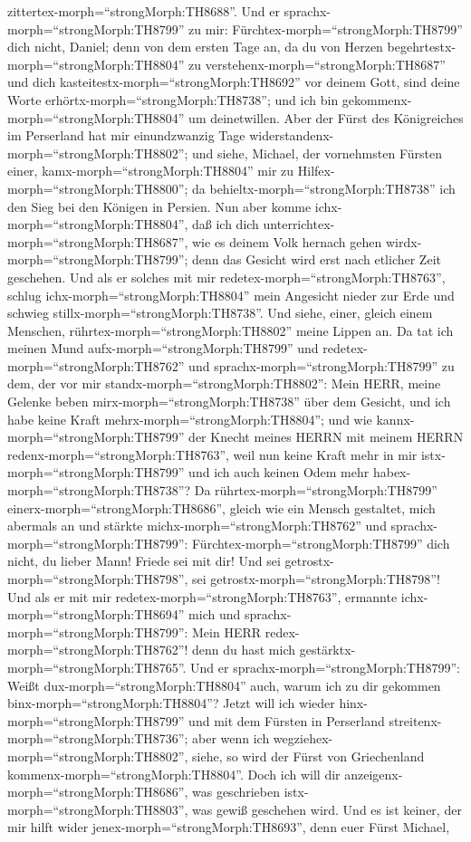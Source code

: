 zittertex-morph=``strongMorph:TH8688''.  Und er
sprachx-morph=``strongMorph:TH8799'' zu mir:
Fürchtex-morph=``strongMorph:TH8799'' dich nicht, Daniel; denn von dem
ersten Tage an, da du von Herzen
begehrtestx-morph=``strongMorph:TH8804'' zu
verstehenx-morph=``strongMorph:TH8687'' und dich
kasteitestx-morph=``strongMorph:TH8692'' vor deinem Gott, sind deine
Worte erhörtx-morph=``strongMorph:TH8738''; und ich bin
gekommenx-morph=``strongMorph:TH8804'' um deinetwillen. 
Aber der Fürst des Königreiches im Perserland hat mir einundzwanzig Tage
widerstandenx-morph=``strongMorph:TH8802''; und siehe, Michael, der
vornehmsten Fürsten einer, kamx-morph=``strongMorph:TH8804'' mir zu
Hilfex-morph=``strongMorph:TH8800''; da
behieltx-morph=``strongMorph:TH8738'' ich den Sieg bei den Königen in
Persien.  Nun aber komme ichx-morph=``strongMorph:TH8804'',
daß ich dich unterrichtex-morph=``strongMorph:TH8687'', wie es deinem
Volk hernach gehen wirdx-morph=``strongMorph:TH8799''; denn das Gesicht
wird erst nach etlicher Zeit geschehen.  Und als er solches
mit mir redetex-morph=``strongMorph:TH8763'', schlug
ichx-morph=``strongMorph:TH8804'' mein Angesicht nieder zur Erde und
schwieg stillx-morph=``strongMorph:TH8738''.  Und siehe,
einer, gleich einem Menschen, rührtex-morph=``strongMorph:TH8802'' meine
Lippen an. Da tat ich meinen Mund aufx-morph=``strongMorph:TH8799'' und
redetex-morph=``strongMorph:TH8762'' und
sprachx-morph=``strongMorph:TH8799'' zu dem, der vor mir
standx-morph=``strongMorph:TH8802'': Mein HERR, meine Gelenke beben
mirx-morph=``strongMorph:TH8738'' über dem Gesicht, und ich habe keine
Kraft mehrx-morph=``strongMorph:TH8804'';  und wie
kannx-morph=``strongMorph:TH8799'' der Knecht meines HERRN mit meinem
HERRN redenx-morph=``strongMorph:TH8763'', weil nun keine Kraft mehr in
mir istx-morph=``strongMorph:TH8799'' und ich auch keinen Odem mehr
habex-morph=``strongMorph:TH8738''?  Da
rührtex-morph=``strongMorph:TH8799''
einerx-morph=``strongMorph:TH8686'', gleich wie ein Mensch gestaltet,
mich abermals an und stärkte michx-morph=``strongMorph:TH8762''
 und sprachx-morph=``strongMorph:TH8799'':
Fürchtex-morph=``strongMorph:TH8799'' dich nicht, du lieber Mann! Friede
sei mit dir! Und sei getrostx-morph=``strongMorph:TH8798'', sei
getrostx-morph=``strongMorph:TH8798''! Und als er mit mir
redetex-morph=``strongMorph:TH8763'', ermannte
ichx-morph=``strongMorph:TH8694'' mich und
sprachx-morph=``strongMorph:TH8799'': Mein HERR
redex-morph=``strongMorph:TH8762''! denn du hast mich
gestärktx-morph=``strongMorph:TH8765''.  Und er
sprachx-morph=``strongMorph:TH8799'': Weißt
dux-morph=``strongMorph:TH8804'' auch, warum ich zu dir gekommen
binx-morph=``strongMorph:TH8804''? Jetzt will ich wieder
hinx-morph=``strongMorph:TH8799'' und mit dem Fürsten in Perserland
streitenx-morph=``strongMorph:TH8736''; aber wenn ich
wegziehex-morph=``strongMorph:TH8802'', siehe, so wird der Fürst von
Griechenland kommenx-morph=``strongMorph:TH8804''.  Doch
ich will dir anzeigenx-morph=``strongMorph:TH8686'', was geschrieben
istx-morph=``strongMorph:TH8803'', was gewiß geschehen wird. Und es ist
keiner, der mir hilft wider jenex-morph=``strongMorph:TH8693'', denn
euer Fürst Michael,

